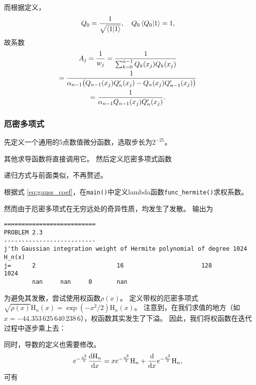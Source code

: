 \documentclass[a4paper,unicode]{report}
\begin{document}
而根据定义，
\begin{equation}
    Q_0 = \frac{1}{\sqrt{\braket{1}}},\quad Q_0 \braket{Q_0}{1} = 1,
\end{equation}
故系数
\begin{multline}\label{eq:gauss_coef}
    A_j = \frac{1}{w_j} = \frac{1}{\sum_{k=0}^{n-1} Q_k(x_j)Q_k(x_j)} \\
    = \frac{1}{\alpha_{n-1} \qty(Q_{n-1}(x_j)Q'_n(x_j) - Q_n(x_j)Q'_{n-1}(x_j))}\\
    = \frac{1}{\alpha_{n-1} Q_{n-1}(x_j)Q'_n(x_j)}.
\end{multline}

\subsubsection{厄密多项式}
先定义一个通用的5点数值微分函数，选取步长为$2^{-25}$。
{
    \linespread{1.0}
    
}
其他求导函数将直接调用它。
然后定义厄密多项式函数
{
    \linespread{1.0}
    
    
}
递归方式与前面类似，不再赘述。

根据式 \eqref{eq:gauss_coef}，在\texttt{main()}中定义lambda函数\texttt{func\_hermite()}求权系数。
{
    \linespread{1.0}
    
}
然而由于厄密多项式在无穷远处的奇异性质，均发生了发散。
输出为
{
\footnotesize
\begin{verbatim}
==========================
PROBLEM 2.3
--------------------------
j'th Gaussian integration weight of Hermite polynomial of degree 1024 H_n(x)
j=      2                       16                      128                     1024
        nan     nan     0       nan
\end{verbatim}
}

为避免其发散，尝试使用权函数$\rho(x)$。
定义带权的厄密多项式$\sqrt{\rho(x)}\mathrm{H}_n(x) = \exp(-x^2/2)\mathrm{H}_n(x)$。
注意到，在我们求值的地方（如$x=-44.353\,625\,640\,238\,6$），权函数其实发生了下溢。
因此，我们将权函数在迭代过程中逐步乘上去：
{
    \linespread{1.0}
    
    
}
同时，导数的定义也需要修改。
\begin{equation}
    e^{-\frac{x^2}{2}}\dv{\mathrm{H}_n}{x} = xe^{-\frac{x^2}{2}}\mathrm{H}_n + \dv{x} e^{-\frac{x^2}{2}}\mathrm{H}_n,
\end{equation}
可有
{
    \linespread{1.0}
    
}
\end{document}

